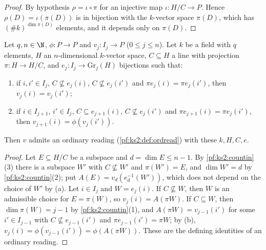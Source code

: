 \begin{proof}
By hypothesis $\rho=\iota\circ\pi$ for an injective map $\iota\colon H/C\to P$. Hence
$\rho(D)=\iota(\pi(D))$ is in bijection with the $k$-vector space $\pi(D)$, which has
$(\#k)^{\dim\pi(D)}$ elements, and it depends only on $\pi(D)$.
\end{proof}

\begin{lemma}\label{pf:ks2:ordreadof}
Let $q,n\in\N$, $\phi\colon P\to P$ and $v_j\colon I_j\to P$ ($0\le j\le n$). Let $k$ be a field with
$q$ elements, $H$ an $n$-dimensional $k$-vector space, $C\subseteq H$ a line with projection
$\pi\colon H\to H/C$, and $e_j\colon I_j\to\mathrm{Gr}_j(H)$ bijections such that:
\begin{enumerate}[label=(\alph*)]
\item if $i,i'\in I_j$, $C\not\subseteq e_j(i)$, $C\not\subseteq e_j(i')$ and $\pi e_j(i)=\pi
  e_j(i')$, then $v_j(i)=v_j(i')$;
\item if $i\in I_{j+1}$, $i'\in I_j$, $C\subseteq e_{j+1}(i)$, $C\not\subseteq e_j(i')$ and $\pi
  e_{j+1}(i)=\pi e_j(i')$, then $v_{j+1}(i)=\phi(v_j(i'))$.
\end{enumerate}
Then $v$ admits an ordinary reading (\cref{pf:ks2:def:ordread}) with these $k,H,C,e$.
\end{lemma}

\begin{proof}
Let $E\subseteq H/C$ be a subspace and $d=\dim E\le n-1$. By \cref{pf:ks2:countin}(3) there is a
subspace $W'$ with $C\not\subseteq W'$ and $\pi(W')=E$, and $\dim W'=d$ by \cref{pf:ks2:countin}(2);
put $A(E)=v_d(e_d^{-1}(W'))$, which does not depend on the choice of $W'$ by (a). Let $i\in I_j$ and
$W=e_j(i)$. If $C\not\subseteq W$, then $W$ is an admissible choice for $E=\pi(W)$, so
$v_j(i)=A(\pi W)$. If $C\subseteq W$, then $\dim\pi(W)=j-1$ by \cref{pf:ks2:countin}(1), and
$A(\pi W)=v_{j-1}(i')$ for some $i'\in I_{j-1}$ with $C\not\subseteq e_{j-1}(i')$ and $\pi
e_{j-1}(i')=\pi W$; by (b), $v_j(i)=\phi(v_{j-1}(i'))=\phi(A(\pi W))$. These are the defining
identities of an ordinary reading.
\end{proof}

